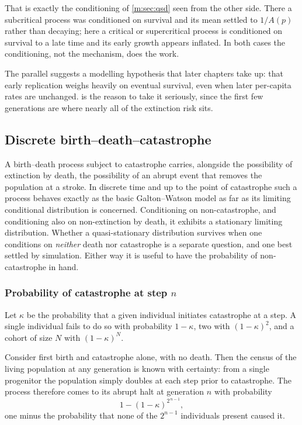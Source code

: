 That is exactly the conditioning of \cref{m:sec:qsd} seen from the other side. There
a subcritical process was conditioned on survival and its mean settled to $1/A(p)$
rather than decaying; here a critical or supercritical process is conditioned on
survival to a late time and its early growth appears inflated. In both cases the
conditioning, not the mechanism, does the work.

The parallel suggests a modelling hypothesis that later chapters take up: that
early replication weighs heavily on eventual survival, even when later per-capita
rates are unchanged.  is the reason to take it seriously, since
the first few generations are where nearly all of the extinction risk sits.

\subsection{Discrete birth--death--catastrophe}
\label{m:sec:bdc}

A birth--death process subject to catastrophe carries, alongside the possibility of
extinction by death, the possibility of an abrupt event that removes the population
at a stroke. In discrete time and up to the point of catastrophe such a process
behaves exactly as the basic Galton--Watson model as far as its limiting
conditional distribution is concerned. Conditioning on non-catastrophe, and
conditioning also on non-extinction by death, it exhibits a stationary limiting
distribution. Whether a quasi-stationary distribution survives when one conditions
on \emph{neither} death nor catastrophe is a separate question, and one best
settled by simulation. Either way it is useful to have the probability of
non-catastrophe in hand.

\subsubsection*{Probability of catastrophe at step \texorpdfstring{$n$}{n}}

Let $\kappa$ be the probability that a given individual initiates catastrophe at a
step. A single individual fails to do so with probability $1-\kappa$, two with
$(1-\kappa)^2$, and a cohort of size $N$ with $(1-\kappa)^N$.

Consider first birth and catastrophe alone, with no death. Then the census of the
living population at any generation is known with certainty: from a single
progenitor the population simply doubles at each step prior to catastrophe. The
process therefore comes to its abrupt halt at generation $n$ with probability
\begin{equation}
\label{m:eq:bdchalt}
1-(1-\kappa)^{2^{\,n-1}},
\end{equation}
one minus the probability that none of the $2^{n-1}$ individuals present caused it.

